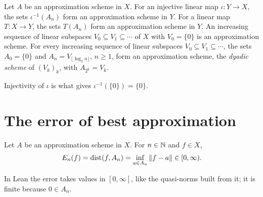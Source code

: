 \begin{definition}
\label{def:comap}
\leanok
{}
Let $A$ be an approximation scheme in $X$. For an injective linear map $\iota : Y \to X$, the
sets $\iota^{-1}(A_n)$ form an approximation scheme in $Y$. For a linear map $T : X \to Y$, the
sets $T(A_n)$ form an approximation scheme in $Y$. An increasing sequence of linear subspaces
$V_0 \subseteq V_1 \subseteq \cdots$ of $X$ with $V_0 = \{0\}$ is an approximation scheme. For
every increasing sequence of linear subspaces $V_0 \subseteq V_1 \subseteq \cdots$, the sets
$A_0 = \{0\}$ and $A_n = V_{\lfloor \log_2 n \rfloor}$, $n \geq 1$, form an approximation scheme,
the \emph{dyadic scheme} of $(V_k)_k$, with $A_{2^k} = V_k$.
\end{definition}

Injectivity of $\iota$ is what gives $\iota^{-1}(\{0\}) = \{0\}$.

\section{The error of best approximation}

\begin{definition}
\label{def:error}
\leanok
{}
Let $A$ be an approximation scheme in $X$. For $n \in \mathbb{N}$ and $f \in X$,
\[
  E_n(f) = \operatorname{dist}(f, A_n) = \inf_{a \in A_n} \|f - a\| \in [0, \infty).
\]
\end{definition}

In Lean the error takes values in $[0, \infty]$, like the quasi-norms built from it; it is
finite because $0 \in A_n$.


